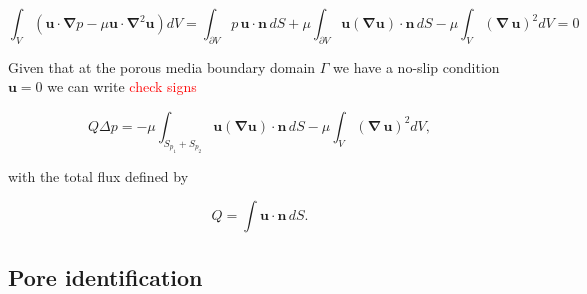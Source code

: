 \documentclass[draft]{agujournal2019}
\newcommand{\markred}[1]{\textcolor{red}{#1}}
\begin{document}
\begin{equation}
\int_V \left(\mathbf{u}\cdot\mathbf{\nabla} p-\mu \mathbf{u}\cdot\mathbf{\nabla}^2 \mathbf{u}\right) dV 
= \int_{\partial V}  p\,\mathbf{u}\cdot\mathbf{n}\,dS+\mu \int_{\partial V} \mathbf{u} (\mathbf{\nabla} \mathbf{u})\cdot\mathbf{n}\,dS-\mu \int_{V} (\mathbf{\nabla}\, \mathbf{u})^2 dV=0 \label{eq:stokes_dissipation}
\end{equation}

Given that at the porous media boundary domain $\Gamma$ we have a no-slip condition $\mathbf{u}=0$ we can write \markred{check signs}

\begin{equation}
	Q \Delta p = -\mu\int_{S_{p_1}+S_{p_2}} \mathbf{u} (\mathbf{\nabla} \mathbf{u})\cdot\mathbf{n}\,dS -\mu \int_V (\mathbf{\nabla}\, \mathbf{u})^2 dV, \label{eq:pressuredrop}
\end{equation}


with the total flux defined by 

\begin{equation}
	Q=\int \mathbf{u}\cdot\mathbf{n}\, dS.
\end{equation}




\subsection{Pore identification}
\end{document}
